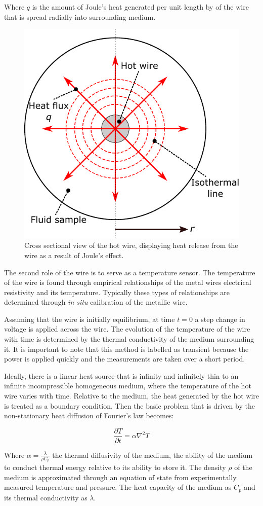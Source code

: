 \documentclass[12pt,MEng]{UoAThesis}
\begin{document}
\noindent Where $q$ is the amount of Joule's heat generated per unit length by of the wire that is spread radially into surrounding medium.

\begin{figure}[htp]
  \centering
  \includegraphics[clip,width=0.4\linewidth]{figures/basicTHW.pdf}
  \caption{\label{fig:testfig} Cross sectional view of the hot wire, displaying heat release from the wire as a result of Joule's effect.}
\end{figure}

\noindent The second role of the wire is to serve as a temperature sensor. The temperature of the wire is found through empirical relationships of the metal wires electrical resistivity and its temperature. Typically these types of relationships are determined through \emph{in situ} calibration of the metallic wire. 

Assuming that the wire is initially equilibrium, at time $t = 0$ a step change in voltage is applied across the wire. The evolution of the temperature of the wire with time is determined by the thermal conductivity of the medium surrounding it. It is important to note that this method is labelled as transient because the power is applied quickly and the measurements are taken over a short period. 

Ideally, there is a linear heat source that is infinity and infinitely thin to an infinite incompressible homogeneous medium, where the temperature of the hot wire varies with time. Relative to the medium, the heat generated by the hot wire is treated as a boundary condition. Then the basic problem that is driven by the non-stationary heat diffusion of Fourier's law becomes:

\begin{equation}
\frac{\partial T}{\partial t} = \alpha \nabla^2T
\end{equation}

\noindent Where $\alpha = \frac{\lambda}{\rho C_p}$ the thermal diffusivity of the medium, the ability of the medium to conduct thermal energy relative to its ability to store it. The density $\rho$ of the medium is approximated through an equation of state from experimentally measured temperature and pressure. The heat capacity of the medium as $C_p$ and its thermal conductivity as $\lambda$. 
\end{document}
